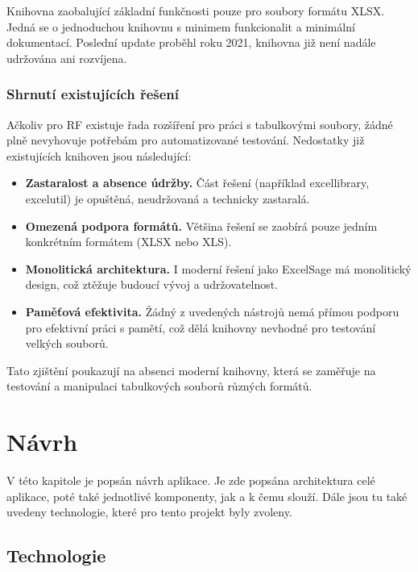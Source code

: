 Knihovna zaobalující základní funkčnosti pouze pro soubory formátu XLSX. Jedná se o jednoduchou knihovnu s minimem funkcionalit a minimální dokumentací. Poslední update proběhl roku 2021, knihovna již není nadále udržována ani rozvíjena.~\cite{excelutil}

\subsection{Shrnutí existujících řešení}

Ačkoliv pro RF existuje řada rozšíření pro práci s tabulkovými soubory, žádné plně nevyhovuje potřebám pro automatizované testování. Nedostatky již existujících knihoven jsou následující:

\begin{itemize}
    \item \textbf{Zastaralost a absence údržby.} Část řešení (například excellibrary, excelutil) je opuštěná, neudržovaná a technicky zastaralá.
    \item \textbf{Omezená podpora formátů.} Většina řešení se zaobírá pouze jedním konkrétním formátem (XLSX nebo XLS).
    \item \textbf{Monolitická architektura.} I moderní řešení jako ExcelSage má monolitický design, což ztěžuje budoucí vývoj a udržovatelnost.
    \item \textbf{Paměťová efektivita.} Žádný z uvedených nástrojů nemá přímou podporu pro efektivní práci s pamětí, což dělá knihovny nevhodné pro testování velkých souborů.
\end{itemize}

Tato zjištění poukazují na absenci moderní knihovny, která se zaměřuje na testování a manipulaci tabulkových souborů různých formátů.

\chapter{Návrh}

V této kapitole je popsán návrh aplikace. Je zde popsána architektura celé aplikace, poté také jednotlivé komponenty, jak a k čemu slouží. Dále jsou tu také uvedeny technologie, které pro tento projekt byly zvoleny.

\section{Technologie}

